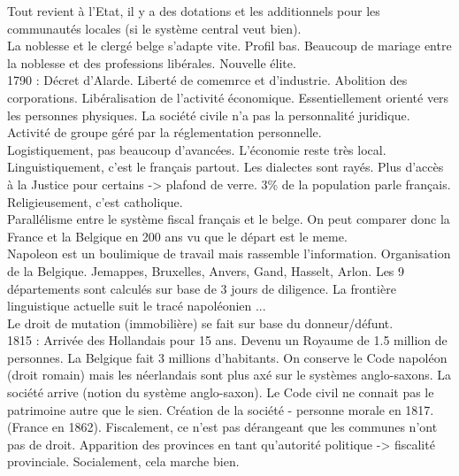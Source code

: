 \documentclass{book}
\begin{document}
Tout revient à l'Etat, il y a des dotations et les additionnels pour les communautés locales (si le système central veut bien).\\

La noblesse et le clergé belge s'adapte vite. Profil bas. Beaucoup de mariage entre la noblesse et des professions libérales. Nouvelle élite.\\

1790 : Décret d'Alarde. Liberté de comemrce et d'industrie. Abolition des corporations. Libéralisation de l'activité économique. Essentiellement orienté vers les personnes physiques. La société civile n'a pas la personnalité juridique. Activité de groupe géré par la réglementation personnelle.\\

Logistiquement, pas beaucoup d'avancées. L'économie reste très local. Linguistiquement, c'est le français partout. Les dialectes sont rayés. Plus d'accès à la Justice pour certains -> plafond de verre. 3\% de la population parle français. Religieusement, c'est catholique.\\

Parallélisme entre le système fiscal français et le belge. On peut comparer donc la France et la Belgique en 200 ans vu que le départ est le meme. \\

Napoleon est un boulimique de travail mais rassemble l'information. Organisation de la Belgique. Jemappes, Bruxelles, Anvers, Gand, Hasselt, Arlon. Les 9 départements sont calculés sur base de 3 jours de diligence. La frontière linguistique actuelle suit le tracé napoléonien ...\\

Le droit de mutation (immobilière) se fait sur base du donneur/défunt.\\


1815 : Arrivée des Hollandais pour 15 ans. Devenu un Royaume de 1.5 million de personnes. La Belgique fait 3 millions d'habitants. On conserve le Code napoléon (droit romain) mais les néerlandais sont plus axé sur le systèmes anglo-saxons. La société arrive (notion du système anglo-saxon). Le Code civil ne connait pas le patrimoine autre que le sien. Création de la société - personne morale en 1817. (France en 1862). Fiscalement, ce n'est pas dérangeant que les communes n'ont pas de droit. Apparition des provinces en tant qu'autorité politique -> fiscalité provinciale. Socialement, cela marche bien. \\
\end{document}
